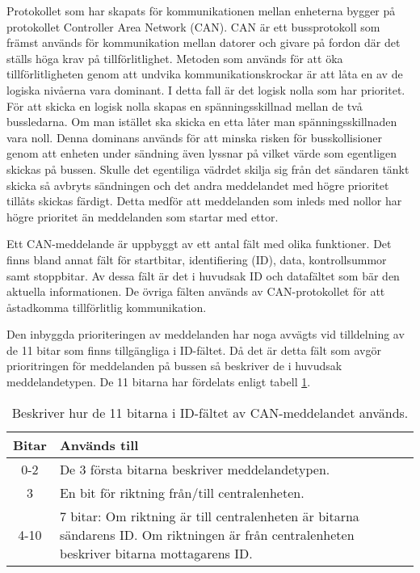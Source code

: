 Protokollet som har skapats för kommunikationen mellan enheterna bygger på protokollet Controller Area Network (CAN). CAN är ett bussprotokoll som främst används för kommunikation mellan datorer och givare på fordon där det ställs höga krav på tillförlitlighet. Metoden som används för att öka tillförlitligheten genom att undvika kommunikationskrockar är att låta en av de logiska nivåerna vara dominant. I detta fall är det logisk nolla som har prioritet. För att skicka en logisk nolla skapas en spänningsskillnad mellan de två bussledarna. Om man istället ska skicka en etta låter man spänningsskillnaden vara noll. Denna dominans används för att minska risken för busskollisioner genom att enheten under sändning även lyssnar på vilket värde som egentligen skickas på bussen. Skulle det egentiliga vädrdet skilja sig från det sändaren tänkt skicka så avbryts sändningen och det andra meddelandet med högre prioritet tillåts skickas färdigt. Detta medför att meddelanden som inleds med nollor har högre prioritet än meddelanden som startar med ettor.

Ett CAN-meddelande är uppbyggt av ett antal fält med olika funktioner. Det finns bland annat fält för startbitar, identifiering (ID), data, kontrollsummor samt stoppbitar. Av dessa fält är det i huvudsak ID och datafältet som bär den aktuella informationen.
De övriga fälten används av CAN-protokollet för att åstadkomma tillförlitlig kommunikation.

Den inbyggda prioriteringen av meddelanden har noga avvägts vid tilldelning av de 11 bitar som finns tillgängliga i ID-fältet.
Då det är detta fält som avgör prioritringen för meddelanden på bussen så beskriver de i huvudsak meddelandetypen.
De 11 bitarna har fördelats enligt tabell \ref{tab:idbitar}.

\begin{table}[H]
	\centering
	\begin{tabular}{|c|p{}|}
		\hline
		Bitar 	& Används till \\ \hline \hline
		0-2		& De 3 första bitarna beskriver meddelandetypen. \\ \hline
		3		& En bit för riktning från/till centralenheten. \\ \hline
		4-10	& 7 bitar:
		Om riktning är till centralenheten är bitarna sändarens ID.
		Om riktningen är från centralenheten beskriver bitarna mottagarens ID. \\ \hline

	\end{tabular}
	\caption{Beskriver hur de 11 bitarna i ID-fältet av CAN-meddelandet används.}
	\label{tab:idbitar}
\end{table}


